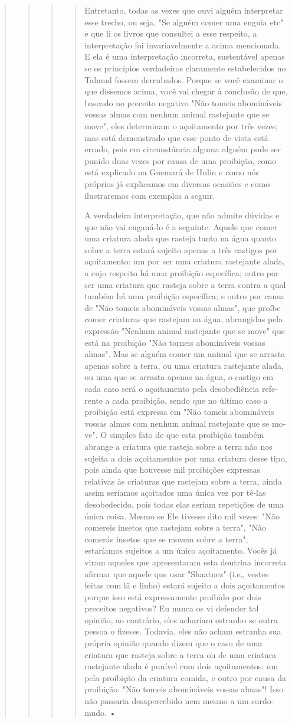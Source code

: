 \begin{quote}
\begin{quote}
\begin{quote}
\begin{quote}
Entretanto, todas as vezes que ouvi alguém interpretar esse trecho, ou
seja, "Se alguém comer uma enguia etc" e que li os livros que consultei
a esse respeito, a interpretação foi invariavelmente a acima mencionada.
E ela é uma interpretação incorreta, sustentável apenas se os princípios
verdadeiros cla­ramente estabelecidos no Talmud fossem derrubados.
Porque se você exami­nar o que dissemos acima, você vai chegar à
conclusão de que, baseado no pre­ceito negativo "Não tomeis abomináveis
vossas almas com nenhum animal ras­tejante que se move", eles determinam
o açoitamento por três vezes; mas está demonstrado que esse ponto de
vista está errado, pois em circunstância algu­ma alguém pode ser punido
duas vezes por causa de uma proibição, como está explicado na Guemará de
Hulin e como nós próprios já explicamos em diver­sas ocasiões e como
ilustraremos com exemplos a seguir.

A verdadeira interpretação, que não admite dúvidas e que não vai
enganá-lo é a seguinte. Aquele que comer uma criatura alada que rasteja
tanto na água quanto sobre a terra estará sujeito apenas a três castigos
por açoitamento: um por ser uma criatura rastejante alada, a cujo
respeito há uma proibição especí­fica; outro por ser uma criatura que
rasteja sobre a terra contra a qual também há uma proibição específica;
e outro por causa de "Não tomeis abomináveis vos­sas almas", que proíbe
comer criaturas que rastejam na água, abrangidas pela ex­pressão "Nenhum
animal rastejante que se move" que está na proibição "Não tor­neis
abomináveis vossas almas". Mas se alguém comer um animal que se arrasta
apenas sobre a terra, ou uma criatura rastejante alada, ou uma que se
arrasta ape­nas na água, o castigo em cada caso será o açoitamento pela
desobediência refe­rente a cada proibição, sendo que no último caso a
proibição está expressa em "Não tomeis abomináveis vossas almas com
nenhum animal rastejante que se mo­ve". O simples fato de que esta
proibição também abrange a criatura que rasteja sobre a terra não nos
sujeita a dois açoitamentos por uma criatura desse tipo, pois ainda que
houvesse mil proibições expressas relativas às criaturas que rastejam
sobre a terra, ainda assim seríamos açoitados uma única vez por tê-las
desobede­cido, pois todas elas seriam repetições de uma única coisa.
Mesmo se Ele tivesse dito mil vezes: "Não comereis insetos que rastejam
sobre a terra", "Não comerás insetos que se movem sobre a terra",
estaríamos sujeitos a um único açoitamento. Vocês já viram aqueles que
apresentaram esta doutrina incorreta afirmar que aquele que usar
"Shaatnez" (i.e„ vestes feitas com lã e linho) estará sujeito a dois
açoita­mentos porque isso está expressamente proibido por dois preceitos
negativos? Eu nunca os vi defender tal opinião, ao contrário, eles
achariam estranho se outra pessoa o fizesse. Todavia, eles não acham
estranha sua própria opinião quando dizem que o caso de uma criatura que
rasteja sobre a terra ou de uma criatura rastejante alada é punível com
dois açoitamentos: um pela proibição da criatura comida, e outro por
causa da proibição: "Não tomeis abomináveis vossas almas"! Isso não
passaria desapercebido nem mesmo a um surdo-mudo. •


\end{quote}
\end{quote}
\end{quote}
\end{quote}
